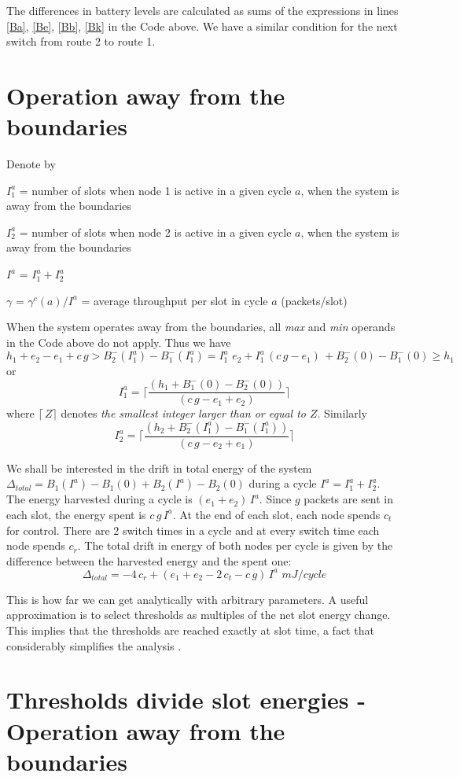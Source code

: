 \documentclass[12 pt]{article}
\newcommand{\debug}[1]{\mbox{\tt #1}}
\renewcommand{\debug}[1]{}              \newcommand{\cmd}[1]{}
\newcommand{\dB}{\begin{description}}
\newcommand{\dE}{\end{description}}
\newcommand{\2}{\>\>}
\newcommand{\3}{\>\>\>}
\newcommand{\4}{\>\>\>\>}
\newcommand{\5}{\>\>\>\>\>}
\newcommand{\6}{\>\>\>\>\>\>}
\newcommand{\7}{\6\>}
\newcommand{\8}{\6\2}
\newcommand{\EB}{\begin{equation}\cmd{EB}}
\newcommand{\EE}[1]{ \debug{\fbox{\sname #1}}\label{\sname #1} \end{equation}\cmd{EE} }
\newcommand{\sname}{}
\newcommand{\dref}[1]{\ref{#1}\debug{[#1]}\cmd{dref}}
\newcommand{\dlabelx}[1]{\debug{\fbox{\tiny #1}}\label{#1}}
\newcounter{protblock}
\newcounter{line}[protblock]
\newcommand{\msec}[2]{\renewcommand{\sname}{}\section[#1
	\debug{\fbox {#2}}]{#1 \cmd{msec} \dlabelx{#2}}\markboth{\today}{Sec. \thesection}}
\renewcommand{\dB}{\begin{description}}
\renewcommand{\dB}{\begin{description}}
\begin{document}
The differences in battery levels are calculated as sums of the expressions in lines \dref{Ba}, \dref{Be}, \dref{Bb}, \dref{Bk} in the Code above.
We have a similar condition for the next switch from route 2 to route 1.

\msec{Operation away from the boundaries}{away2}

Denote by
\dB
\item{$I_1^a$} = number of slots when node 1 is active in a given cycle $a$, when the system is away from the boundaries
\item{$I_2^a$} = number of slots when node 2 is active in a given cycle $a$, when the system is away from the boundaries
\item{$I^a$} = $I_1^a + I_2^a$
\item{$\gamma$} = $\gamma^c(a) / I^a$ = average throughput per slot in cycle $a$ (packets/slot)
\dE

When the system operates away from the boundaries, all \emph{max} and \emph{min} operands in the Code above do not apply.  Thus we have
\EB
h_1 + e_2 - e_1 + c\,g > B^{-}_2(I_1^a) - B^{-}_1(I_1^a) = I_1^a\,\, e_2    + I_1^a\,(c\,g - e_1)\, + B^{-}_2(0) - B^{-}_1(0) \geq h_1
\EE{eq-Iaax}
or
\EB
I_1^a = \lceil\frac{(h_1 + B^{-}_1(0) - B^{-}_2(0))}{(c\,g -e_1 + e_2)}\rceil
\EE{eq-Iaa}
where $\lceil\,Z\rceil$ denotes \emph{the smallest integer larger than or equal to $Z$}.
Similarly
\EB
I_2^a = \lceil\frac{(h_2 + B^{-}_2(I_1^a) - B^{-}_1(I_1^a))}{(c\,g -e_2 + e_1)}\rceil
\EE{eq-Iaay}

We shall be interested in the drift in total energy of the system $\Delta_{total} = B_1(I^a) - B_1(0) + B_2(I^a) - B_2(0)$ during a cycle $I^a = I_1^a + I_2^a$.   The energy harvested during a cycle is $(e_1 + e_2)\,I^a$.  Since $g$ packets are sent in each slot, the energy spent is $c\,g\,I^a$.  At the end of each slot, each node spends $c_t$ for control.  There are 2 switch times in a cycle and at every switch time each node spends $c_r$.  The total drift in energy of both nodes per cycle is given by the difference between the harvested energy and the spent one:
\EB
\Delta_{total} = -4\,c_r + (e_1 + e_2 - 2\,c_t -c\,g)\,I^a \,\,mJ/cycle
\EE{eq-BDtotal}


This is how far we can get analytically with arbitrary parameters.  A useful approximation is to select thresholds as multiples of the net slot energy change.  This implies that the thresholds are reached exactly at slot time, a fact that considerably simplifies the analysis .

\msec{Thresholds divide slot energies - Operation away from the boundaries}{divide}
\end{document}
